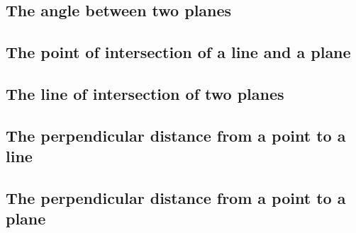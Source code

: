 \subsection{The angle between two planes}


\subsection{The point of intersection of a line and a plane}
\subsection{The line of intersection of two planes}


\subsection{The perpendicular distance from a point to a line}




\subsection{The perpendicular distance from a point to a plane}
   
